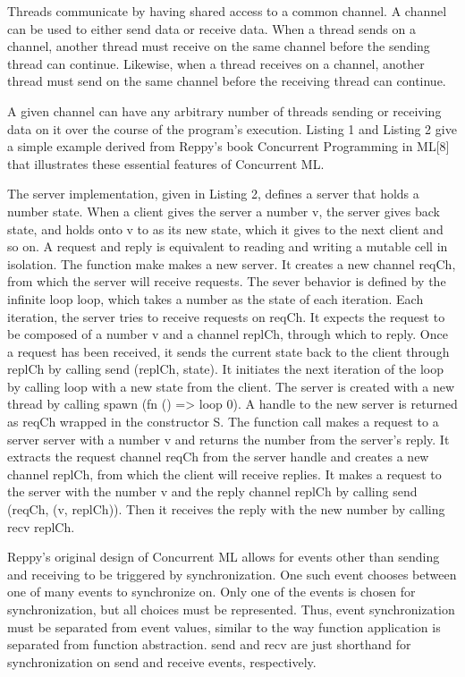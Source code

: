 \documentclass{article}
\begin{document}
Threads communicate by having shared access to a common channel.  A channel can be used to
either send data or receive data.  When a thread sends on a channel, another thread must
receive on the same channel before the sending thread can continue.  Likewise, when a thread
receives on a channel, another thread must send on the same channel before the receiving thread
can continue.

A given channel can have any arbitrary number of threads sending or receiving data on it over
the course of the program's execution.  Listing 1 and Listing 2 give a simple example derived
from Reppy's book Concurrent Programming in ML[8] that illustrates these essential features of
Concurrent ML.

The server implementation, given in Listing 2, defines a server that holds a number state.
When a client gives the server a number v, the server gives back state, and holds onto v to as
its new state, which it gives to the next client and so on.  A request and reply is equivalent
to reading and writing a mutable cell in isolation.  The function make makes a new server.  It
creates a new channel reqCh, from which the server will receive requests.  The sever behavior
is defined by the infinite loop loop, which takes a number as the state of each iteration.
Each iteration, the server tries to receive requests on reqCh.  It expects the request to be
composed of a number v and a channel replCh, through which to reply.  Once a request has been
received, it sends the current state back to the client through replCh by calling
send (replCh, state).  It initiates the next iteration of the loop by calling loop with a new
state from the client.  The server is created with a new thread by calling
spawn (fn () => loop 0).   A handle to the new server is returned as reqCh wrapped in the
constructor S.  The function call makes a request to a server server with a number v and
returns the number from the server's reply.  It extracts the request channel reqCh from the
server handle and creates a new channel replCh, from which the client will receive replies.
It makes a request to the server with the number v and the reply channel replCh by calling
send (reqCh, (v, replCh)).  Then it receives the reply with the new number by calling recv
replCh.

Reppy's original design of Concurrent ML allows for events other than sending and receiving to
be triggered by synchronization.  One such event chooses between one of many events to
synchronize on.  Only one of the events is chosen for synchronization, but all choices must be
represented.  Thus, event synchronization must be separated from event values, similar to the
way function application is separated from function abstraction.  send and recv are just
shorthand for synchronization on send and receive events, respectively.
\end{document}
